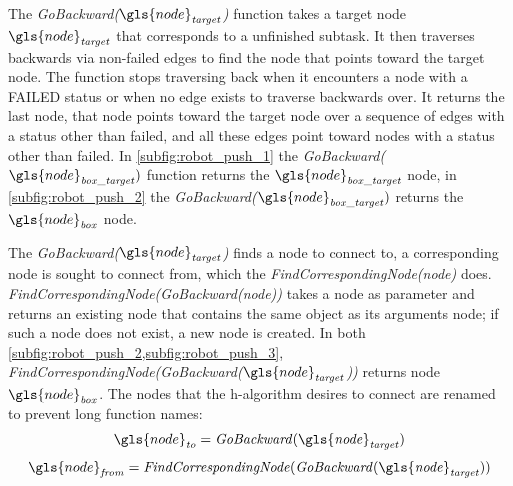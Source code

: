 The \textit{GoBackward($\gls{node}_\mathit{target}$)} function takes a target node $\gls{node}_\mathit{target}$ that corresponds to a unfinished subtask. It then traverses backwards via non-failed edges to find the node that points toward the target node. The function stops traversing back when it encounters a node with a FAILED status or when no edge exists to traverse backwards over. It returns the last node, that node points toward the target node over a sequence of edges with a status other than failed, and all these edges point toward nodes with a status other than failed. In \cref{subfig:robot_push_1} the \textit{GoBackward($\gls{node}_\mathit{box\_target})$} function returns the $\gls{node}_\mathit{box\_target}$ node, in \cref{subfig:robot_push_2} the \textit{GoBackward($\gls{node}_\mathit{box\_target})$} returns the $\gls{node}_\mathit{box}$ node.\bs

The \textit{GoBackward($\gls{node}_\mathit{target}$)} finds a node to connect to, a corresponding node is sought to connect from, which the \textit{FindCorrespondingNode(\gls{node})} does. \textit{FindCorrespondingNode(GoBackward(\gls{node}))} takes a node as parameter and returns an existing node that contains the same object as its arguments node; if such a node does not exist, a new node is created. In both \cref{subfig:robot_push_2,subfig:robot_push_3}, \textit{FindCorrespondingNode(GoBackward($\gls{node}_\mathit{target}$))} returns node $\gls{node}_\mathit{box}$. The nodes that the \ac{h-algorithm} desires to connect are renamed to prevent long function names:
\[\gls{node}_\mathit{to} =  \mathit{GoBackward(\gls{node}_\mathit{target})}\]
\[\gls{node}_\mathit{from} = \mathit{FindCorrespondingNode(GoBackward(\gls{node}_\mathit{target}))}\]

